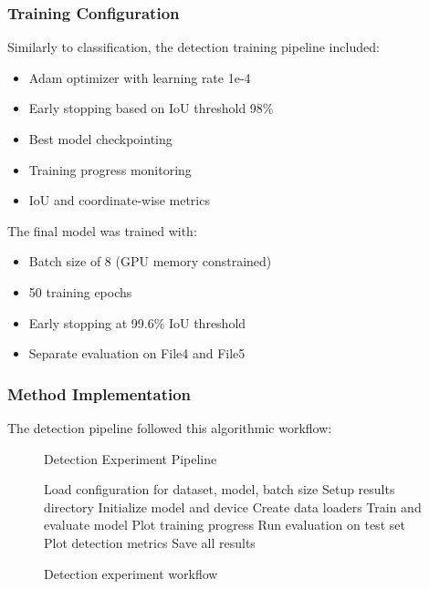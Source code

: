 \documentclass[conference]{IEEEtran}
\begin{document}
\subsubsection{Training Configuration}

Similarly to classification, the detection training pipeline included:

\begin{itemize}
  \item Adam optimizer with learning rate 1e-4
  \item Early stopping based on IoU threshold 98\%
  \item Best model checkpointing
  \item Training progress monitoring
  \item IoU and coordinate-wise metrics
\end{itemize}

The final model was trained with:

\begin{itemize}
  \item Batch size of 8 (GPU memory constrained)
  \item 50 training epochs
  \item Early stopping at 99.6\% IoU threshold
  \item Separate evaluation on File4 and File5
\end{itemize}

\subsubsection{Method Implementation}

The detection pipeline followed this algorithmic workflow:

\begin{figure}[H]
\begin{algorithm}[H]
\caption{Detection Experiment Pipeline}
\begin{algorithmic}[1]
\STATE Load configuration for dataset, model, batch size
    \STATE Setup results directory
    \STATE Initialize model and device
    \STATE Create data loaders
    \STATE Train and evaluate model
    \STATE Plot training progress
    \STATE Run evaluation on test set
    \STATE Plot detection metrics
    \STATE Save all results
\ENDFOR
\end{algorithmic}
\end{algorithm}
\caption{Detection experiment workflow}
\end{figure}
\end{document}
